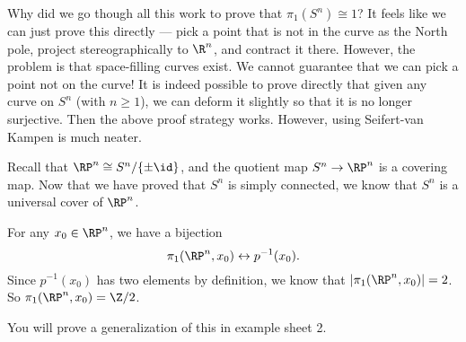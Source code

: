 \documentclass[a4paper]{article}
\begin{document}
Why did we go though all this work to prove that $\pi_1(S^n) \cong 1$? It feels like we can just prove this directly --- pick a point that is not in the curve as the North pole, project stereographically to $\R^n$, and contract it there. However, the problem is that space-filling curves exist. We cannot guarantee that we can pick a point not on the curve! It is indeed possible to prove directly that given any curve on $S^n$ (with $n \geq 1$), we can deform it slightly so that it is no longer surjective. Then the above proof strategy works. However, using Seifert-van Kampen is much neater.

\begin{eg}[$\RP^n$]
  Recall that $\RP^n \cong S^n/\{\pm \id\}$, and the quotient map $S^n \to \RP^n$ is a covering map. Now that we have proved that $S^n$ is simply connected, we know that $S^n$ is a universal cover of $\RP^n$.

  For any $x_0 \in \RP^n$, we have a bijection
  \[
    \pi_1(\RP^n, x_0) \leftrightarrow p^{-1}(x_0).
  \]
  Since $p^{-1}(x_0)$ has two elements by definition, we know that $|\pi_1(\RP^n, x_0)| = 2$. So $\pi_1(\RP^n, x_0) = \Z/2$.
\end{eg}
You will prove a generalization of this in example sheet 2.
\end{document}
